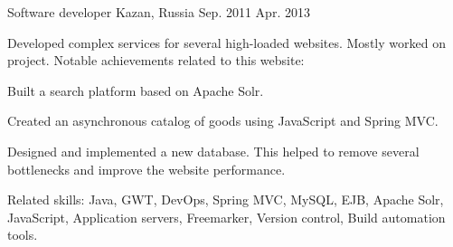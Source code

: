\begin{cventries}
  \cventry
    {Software developer} %
    {} %
    {Kazan, Russia} %
    {Sep. 2011 \textemdash{} Apr. 2013} %
    {
    Developed complex services for several high-loaded websites. Mostly worked on  project. Notable achievements related to this website:
      \begin{cvitems}          
      \item{Built a search platform based on Apache Solr.}
      \item{Created an asynchronous catalog of goods using JavaScript and Spring MVC.}
      \item{Designed and implemented a new database. This helped to remove several bottlenecks and improve the website performance.}
      \end{cvitems}
	Related skills: Java, GWT, DevOps, Spring MVC, MySQL, EJB, Apache Solr, JavaScript, Application servers, Freemarker, Version control, Build automation tools.
    }
\end{cventries}

